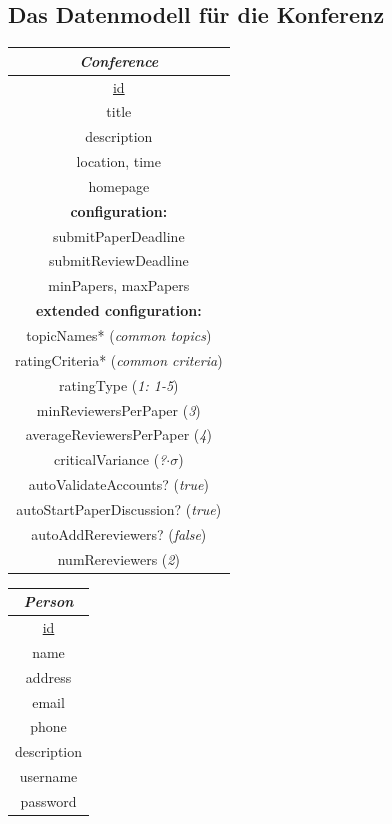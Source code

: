 \documentclass[headexclude,footexclude,12pt,BCOR0pt,DIV15]{scrartcl}
\begin{document}
    \subsection{Das Datenmodell f\"{u}r die Konferenz}
\begin{center}
    \begin{tabular}{|c|}
      \hline
      \emph{Conference} \\
      \hline
      \underline{id} \\
      title \\
      description \\
      location, time \\
      homepage \\
      \textbf{configuration:} \\
      submitPaperDeadline \\
      submitReviewDeadline \\
      minPapers, maxPapers \\
      \textbf{extended configuration:} \\
      topicNames* (\textit{common topics}) \\
      ratingCriteria* (\textit{common criteria}) \\
      ratingType (\textit{1: 1-5}) \\
      minReviewersPerPaper (\textit{3}) \\
      averageReviewersPerPaper (\textit{4}) \\
      criticalVariance (\textit{?$\cdot\sigma$}) \\
      autoValidateAccounts? (\textit{true}) \\
      autoStartPaperDiscussion? (\textit{true}) \\
      autoAddRereviewers? (\textit{false}) \\
      numRereviewers (\textit{2}) \\
      \hline
    \end{tabular}
    \begin{tabular}{|c|}
      \hline
      \emph{Person} \\
      \hline
      \underline{id} \\
      name \\
      address \\
      email \\
      phone \\
      description \\
      username \\
      password \\

\end{tabular}
\end{center}
\end{document}
